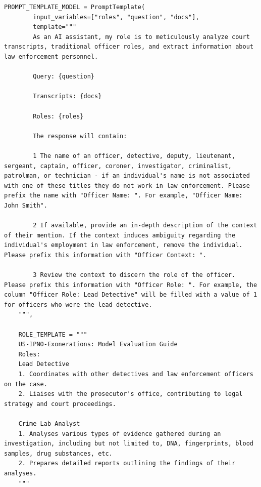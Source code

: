 \documentclass{article}
\begin{document}
\begin{lstlisting}[language={}, breaklines=true, caption=Code Snippet 5]
    PROMPT_TEMPLATE_MODEL = PromptTemplate(
        input_variables=["roles", "question", "docs"],
        template="""
        As an AI assistant, my role is to meticulously analyze court transcripts, traditional officer roles, and extract information about law enforcement personnel.
    
        Query: {question}
    
        Transcripts: {docs}
    
        Roles: {roles}
    
        The response will contain:
    
        1 The name of an officer, detective, deputy, lieutenant, sergeant, captain, officer, coroner, investigator, criminalist, patrolman, or technician - if an individual's name is not associated with one of these titles they do not work in law enforcement. Please prefix the name with "Officer Name: ". For example, "Officer Name: John Smith".
    
        2 If available, provide an in-depth description of the context of their mention. If the context induces ambiguity regarding the individual's employment in law enforcement, remove the individual. Please prefix this information with "Officer Context: ". 
    
        3 Review the context to discern the role of the officer. Please prefix this information with "Officer Role: ". For example, the column "Officer Role: Lead Detective" will be filled with a value of 1 for officers who were the lead detective.
    """,
    
    ROLE_TEMPLATE = """
    US-IPNO-Exonerations: Model Evaluation Guide 
    Roles:
    Lead Detective
    1. Coordinates with other detectives and law enforcement officers on the case.
    2. Liaises with the prosecutor's office, contributing to legal strategy and court proceedings.

    Crime Lab Analyst
    1. Analyses various types of evidence gathered during an investigation, including but not limited to, DNA, fingerprints, blood samples, drug substances, etc.
    2. Prepares detailed reports outlining the findings of their analyses.
    """
\end{lstlisting}
\end{document}

